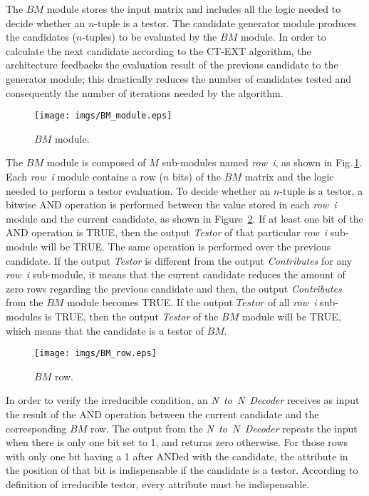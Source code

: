 \documentclass[letterpaper, twoside, openright, 12pt]{book}%
\begin{document}
	The $BM$ module stores the input matrix and includes all the logic needed to decide whether an $n$-tuple is a testor. The candidate generator module produces the candidates ($n$-tuples) to be evaluated by the $BM$ module. In order to calculate the next candidate according to the CT-EXT algorithm, the architecture feedbacks the evaluation result of the previous candidate to the generator module; this drastically reduces the number of candidates tested and consequently the number of iterations needed by the algorithm. 	
	
	\begin{figure}[htb]
	    \begin{center}
	        \texttt{[image: imgs/BM\_module.eps]}
	    \end{center}
	\caption{$BM$ module.}
	\label{fig:bmModule}
	\end{figure}
	
	The $BM$ module is composed of $M$ sub-modules named \textit{row~i}, as shown in Fig.\,\ref{fig:bmModule}. Each \textit{row~i} module contains a row ($n$ bits) of the $BM$ matrix and the logic needed to perform a testor evaluation. To decide whether an $n$-tuple is a testor, a bitwise AND operation is performed between the value stored in each \textit{row~i} module and the current candidate, as shown in Figure~\ref{fig:row}. If at least one bit of the AND operation is TRUE, then the output \textit{Testor} of that particular \textit{row~i} sub-module will be TRUE. The same operation is performed over the previous candidate. If the output \textit{Testor} is different from the output \textit{Contributes} for any \textit{row~i} sub-module, it means that the current candidate reduces the amount of zero rows regarding the previous candidate and then, the output \textit{Contributes} from the $BM$ module becomes TRUE. If the output $Testor$ of all  \textit{row~i} sub-modules is TRUE, then the output \textit{Testor} of the $BM$ module will be TRUE, which means that the candidate is a testor of $BM$.
	
	\begin{figure}[htb]
	    \begin{center}
	        \texttt{[image: imgs/BM\_row.eps]}
	    \end{center}
	\caption{$BM$ row.}
	\label{fig:row}
	\end{figure}
		
	In order to verify the irreducible condition, an \textit{N~to~N~Decoder} receives as input the result of the AND operation between the current candidate and the corresponding $BM$ row. The output from the \textit{N~to~N~Decoder} repeats the input when there is only one bit set to 1, and returns zero otherwise. For those rows with only one bit having a 1 after ANDed with the candidate, the attribute in the position of that bit is indispensable if the candidate is a testor. According to definition of irreducible testor, every attribute must be indispensable.
	
\end{document}
